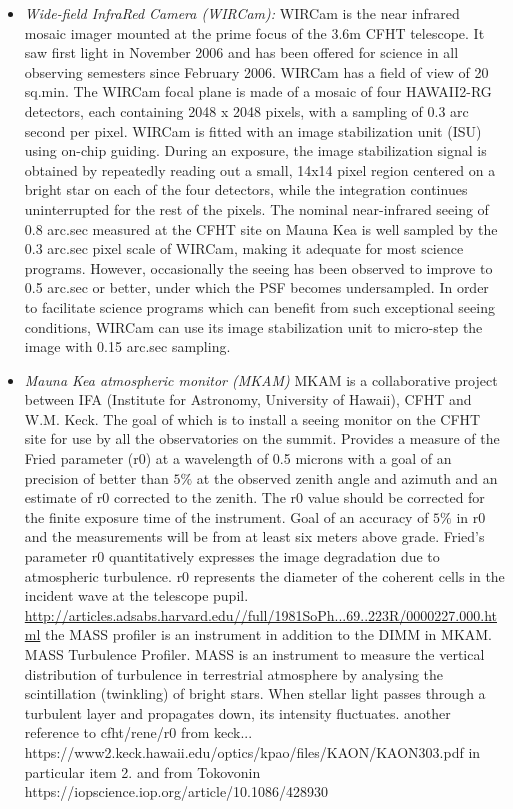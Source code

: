 \begin{itemize}
\item \emph{Wide-field InfraRed Camera (WIRCam):} WIRCam  is the near infrared mosaic imager mounted at the prime focus of the 3.6m CFHT telescope. It saw first light in November 2006 and has been offered for science in all observing semesters since February 2006. 
WIRCam has a field of view of 20 sq.min. The WIRCam focal plane is made of a mosaic of four HAWAII2-RG detectors, each containing 2048 x 2048 pixels, with a sampling of 0.3 arc second per pixel. WIRCam is fitted with an image stabilization unit (ISU) using on-chip guiding. During an exposure, the image stabilization signal is obtained by repeatedly reading out a small, 14x14 pixel region centered on a bright star on each of the four detectors, while the integration continues uninterrupted for the rest of the pixels. The nominal near-infrared seeing of 0.8 arc.sec measured at the CFHT site on Mauna Kea is well sampled by the 0.3 arc.sec pixel scale of WIRCam, making it adequate for most science programs. However, occasionally the seeing has been observed to improve to 0.5 arc.sec or better, under which the PSF becomes undersampled. In order to facilitate science programs which can benefit from such exceptional seeing conditions, WIRCam can use its image stabilization unit to micro-step the image with 0.15 arc.sec sampling. 
\item \emph{Mauna Kea atmospheric monitor (MKAM)} MKAM is a collaborative project between IFA (Institute for Astronomy, University of Hawaii), CFHT and W.M. Keck. The goal of which is to install a seeing monitor on the CFHT site for use by all the observatories on the summit.  Provides a measure of the Fried parameter (r0) at a wavelength of 0.5 microns with a goal of an precision of better than $5\%$ at the observed zenith angle and azimuth and an estimate of r0 corrected to the zenith. The r0 value should be corrected for the finite exposure time of the instrument. Goal of an accuracy of $5\%$ in r0 and the measurements will be from at least six meters above grade.
Fried's parameter r0 quantitatively expresses the image degradation due to atmospheric turbulence.  r0 represents the diameter of the coherent cells in the incident wave at the telescope pupil.
\url{http://articles.adsabs.harvard.edu//full/1981SoPh...69..223R/0000227.000.html}
the MASS profiler is an instrument in addition to the DIMM in MKAM.
MASS Turbulence Profiler. MASS is an instrument to measure the vertical distribution of turbulence in terrestrial atmosphere by analysing the scintillation (twinkling) of bright stars. When stellar light passes through a turbulent layer and propagates down, its intensity fluctuates.
another reference to cfht/rene/r0 from keck...
https://www2.keck.hawaii.edu/optics/kpao/files/KAON/KAON303.pdf
in particular item 2.
and from Tokovonin 
https://iopscience.iop.org/article/10.1086/428930
\end{itemize}

